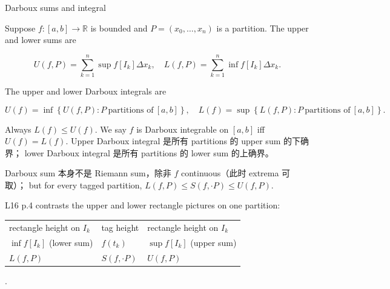 \begin{definition}{Darboux sums and integral}

Suppose \(f:\left\lbrack {a,b} \right\rbrack\rightarrow\mathbb{R}\) is bounded and \(P = \left( {x_{0},\ldots,x_{n}} \right)\) is a partition. The upper and lower sums are

\[U\left( {f,P} \right) = \sum\limits_{k = 1}^{n}\sup f\left\lbrack I_{k} \right\rbrack\Delta x_{k},\quad L\left( {f,P} \right) = \sum\limits_{k = 1}^{n}\inf f\left\lbrack I_{k} \right\rbrack\Delta x_{k}.\]

The upper and lower Darboux integrals are

\[U(f) = \inf\left\{ {U\left( {f,P} \right):P\ \text{partitions of}\ \left\lbrack {a,b} \right\rbrack} \right\},\quad L(f) = \sup\left\{ {L\left( {f,P} \right):P\ \text{partitions of}\ \left\lbrack {a,b} \right\rbrack} \right\}.\]

Always \(L(f) \leq U(f)\). We say \(f\) is Darboux integrable on \(\left\lbrack {a,b} \right\rbrack\) iff \(U(f) = L(f)\). Upper Darboux integral 是所有 partitions 的 upper sum 的下确界； lower Darboux integral 是所有 partitions 的 lower sum 的上确界。

Darboux sum 本身不是 Riemann sum，除非 \(f\) continuous（此时 extrema 可取）； but for every tagged partition, \(L\left( {f,P} \right) \leq S\left( {f, \cdot P} \right) \leq U\left( {f,P} \right)\).

L16 p.4 contrasts the upper and lower rectangle pictures on one partition:

{\def\LTcaptype{none} %
\begin{longtable}[]{@{}lll@{}}
\toprule\noalign{}
\endhead
\bottomrule\noalign{}
\endlastfoot
rectangle height on \(I_{k}\) & tag height & rectangle height on \(I_{k}\) \\
\(\inf f\left\lbrack I_{k} \right\rbrack\) (lower sum) & \(f\left( t_{k} \right)\) & \(\sup f\left\lbrack I_{k} \right\rbrack\) (upper sum) \\
\(L\left( {f,P} \right)\) & \(S\left( {f, \cdot P} \right)\) & \(U\left( {f,P} \right)\) \\
\end{longtable}
}

.

\end{definition}

